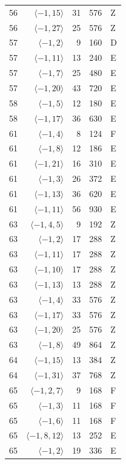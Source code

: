 \begin{longtable}{rrrrl}
56 & $\langle -1, 15\rangle$ & 31 & 576 & Z \\
56 & $\langle -1, 27\rangle$ & 25 & 576 & Z \\
57 & $\langle -1, 2\rangle$ & 9 & 160 & D \\
57 & $\langle -1, 11\rangle$ & 13 & 240 & E \\
57 & $\langle -1, 7\rangle$ & 25 & 480 & E \\
57 & $\langle -1, 20\rangle$ & 43 & 720 & E \\
58 & $\langle -1, 5\rangle$ & 12 & 180 & E \\
58 & $\langle -1, 17\rangle$ & 36 & 630 & E \\
61 & $\langle -1, 4\rangle$ & 8 & 124 & F \\
61 & $\langle -1, 8\rangle$ & 12 & 186 & E \\
61 & $\langle -1, 21\rangle$ & 16 & 310 & E \\
61 & $\langle -1, 3\rangle$ & 26 & 372 & E \\
61 & $\langle -1, 13\rangle$ & 36 & 620 & E \\
61 & $\langle -1, 11\rangle$ & 56 & 930 & E \\
63 & $\langle -1, 4, 5\rangle$ & 9 & 192 & Z \\
63 & $\langle -1, 2\rangle$ & 17 & 288 & Z \\
63 & $\langle -1, 11\rangle$ & 17 & 288 & Z \\
63 & $\langle -1, 10\rangle$ & 17 & 288 & Z \\
63 & $\langle -1, 13\rangle$ & 13 & 288 & Z \\
63 & $\langle -1, 4\rangle$ & 33 & 576 & Z \\
63 & $\langle -1, 17\rangle$ & 33 & 576 & Z \\
63 & $\langle -1, 20\rangle$ & 25 & 576 & Z \\
63 & $\langle -1, 8\rangle$ & 49 & 864 & Z \\
64 & $\langle -1, 15\rangle$ & 13 & 384 & Z \\
64 & $\langle -1, 31\rangle$ & 37 & 768 & Z \\
65 & $\langle -1, 2, 7\rangle$ & 9 & 168 & F \\
65 & $\langle -1, 3\rangle$ & 11 & 168 & F \\
65 & $\langle -1, 6\rangle$ & 11 & 168 & F \\
65 & $\langle -1, 8, 12\rangle$ & 13 & 252 & E \\
65 & $\langle -1, 2\rangle$ & 19 & 336 & E \\

\end{longtable}
